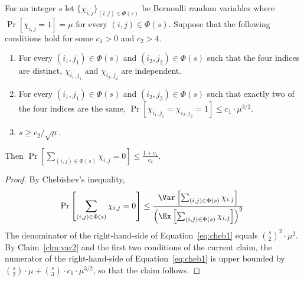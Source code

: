 \begin{corollary}\label{cor:cheb1}
For an integer $s$
let $\{\chi_{i,j}\}_{(i,j)\in \Phi(s)}$ be Bernoulli random variables where
 $\Pr[\chi_{i,j} = 1] = \mu$ for every $(i,j)\in \Phi(s)$. Suppose that the following conditions hold
 for some $c_1>0$ and $c_2 > 4$.
\begin{enumerate}
\item For every $(i_1,j_1)\in \Phi(s)$ and $(i_2,j_2)\in \Phi(s)$ such that the four indices are distinct, $\chi_{i_1,j_1}$
and $\chi_{i_2,j_2}$ are independent.
\item For every $(i_1,j_1)\in \Phi(s)$ and $(i_2,j_2)\in \Phi(s)$  such that exactly two of the four indices are the same,
$\Pr[\chi_{i_1,j_1}=\chi_{i_2,j_2} = 1] \leq c_1\cdot \mu^{3/2}$.
\item %
   $s \geq c_2/\sqrt{\mu}$\;.
\end{enumerate}
Then $\Pr\left[ \sum_{(i,j)\in \Phi(s)} \chi_{i,j} = 0\right] \leq \frac{1+c_1}{c_2}$.
\end{corollary}

\begin{proof}
By Chebishev's inequality,
\begin{equation}\label{eq:cheb1}
\Pr\left[\sum_{(i,j)\in \Phi(s)}\chi_{i,j}=0\right] \leq \frac{\Var\left[\sum_{(i,j)\in \Phi(s)} \chi_{i,j}\right]}{\left(\Ex\left[\sum_{(i,j)\in \Phi(s)}\chi_{i,j}\right]\right)^2}\;
\end{equation}
The denominator of the right-hand-side of Equation~\eqref{eq:cheb1} equals
${s\choose 2}^2\cdot \mu^2$.
By Claim~\ref{clm:var2} and the first two conditions of the current claim, the numerator of the right-hand-side of Equation~\eqref{eq:cheb1} is upper bounded by
${s\choose 2}\cdot \mu + {s\choose 3}\cdot c_1\cdot \mu^{3/2}$, so that the claim follows.
\end{proof}